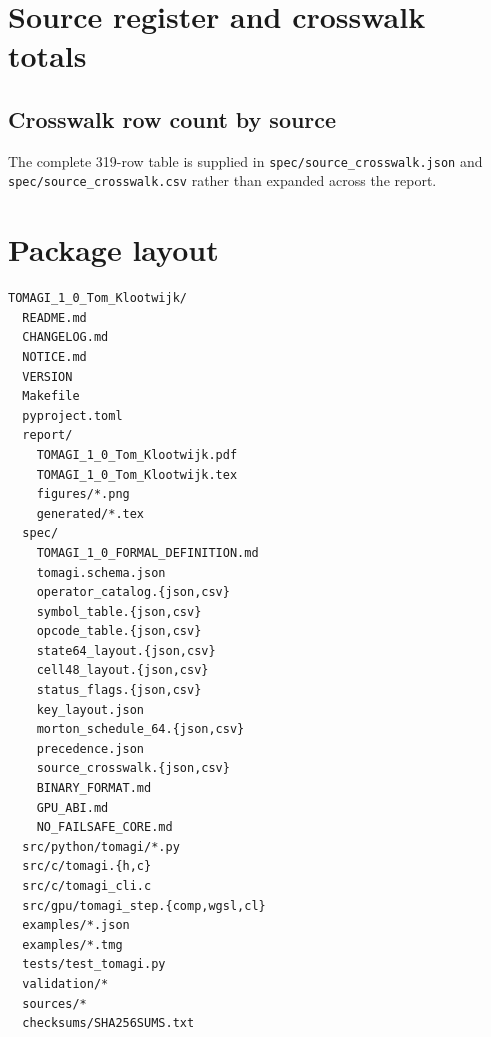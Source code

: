 \documentclass[11pt,a4paper]{article}
\newcommand{\code}[1]{\texttt{#1}}
\begin{document}
\clearpage
\section{Source register and crosswalk totals}


\subsection*{Crosswalk row count by source}
\begin{center}

\end{center}
The complete 319-row table is supplied in \code{spec/source\_crosswalk.json} and \code{spec/source\_crosswalk.csv} rather than expanded across the report.

\clearpage
\section{Package layout}
\begin{lstlisting}
TOMAGI_1_0_Tom_Klootwijk/
  README.md
  CHANGELOG.md
  NOTICE.md
  VERSION
  Makefile
  pyproject.toml
  report/
    TOMAGI_1_0_Tom_Klootwijk.pdf
    TOMAGI_1_0_Tom_Klootwijk.tex
    figures/*.png
    generated/*.tex
  spec/
    TOMAGI_1_0_FORMAL_DEFINITION.md
    tomagi.schema.json
    operator_catalog.{json,csv}
    symbol_table.{json,csv}
    opcode_table.{json,csv}
    state64_layout.{json,csv}
    cell48_layout.{json,csv}
    status_flags.{json,csv}
    key_layout.json
    morton_schedule_64.{json,csv}
    precedence.json
    source_crosswalk.{json,csv}
    BINARY_FORMAT.md
    GPU_ABI.md
    NO_FAILSAFE_CORE.md
  src/python/tomagi/*.py
  src/c/tomagi.{h,c}
  src/c/tomagi_cli.c
  src/gpu/tomagi_step.{comp,wgsl,cl}
  examples/*.json
  examples/*.tmg
  tests/test_tomagi.py
  validation/*
  sources/*
  checksums/SHA256SUMS.txt
\end{lstlisting}
\end{document}
